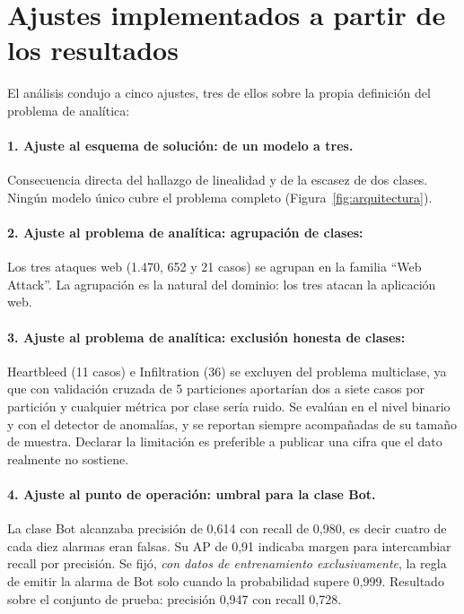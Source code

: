 \documentclass[11pt,a4paper]{article}
\begin{document}
\section{Ajustes implementados a partir de los resultados}
\label{sec:ajustes}

El análisis condujo a cinco ajustes, tres de ellos sobre la propia definición
del problema de analítica:

\paragraph{1. Ajuste al esquema de solución: de un modelo a tres.}
Consecuencia directa del hallazgo de linealidad y de la escasez de dos
clases. Ningún modelo único cubre el problema completo
(Figura~\ref{fig:arquitectura}).

\paragraph{2. Ajuste al problema de analítica: agrupación de clases:}
Los tres ataques web (1.470, 652 y 21 casos) se agrupan en la familia
``Web Attack''. La agrupación es la natural del dominio: los tres
atacan la aplicación web.

\paragraph{3. Ajuste al problema de analítica: exclusión honesta de clases:}
Heartbleed (11 casos) e Infiltration (36) se excluyen del problema
multiclase, ya que con validación cruzada de 5 particiones aportarían dos a siete
casos por partición y cualquier métrica por clase sería ruido. Se evalúan en
el nivel binario y con el detector de anomalías, y se reportan siempre
acompañadas de su tamaño de muestra. Declarar la limitación es preferible a
publicar una cifra que el dato realmente no sostiene.

\paragraph{4. Ajuste al punto de operación: umbral para la clase Bot.}
La clase Bot alcanzaba precisión de 0,614 con recall de 0,980, es decir cuatro de cada
diez alarmas eran falsas. Su AP de 0,91 indicaba margen para intercambiar
recall por precisión. Se fijó, \emph{con datos de entrenamiento
exclusivamente}, la regla de emitir la alarma de Bot solo cuando la probabilidad
supere 0,999. Resultado sobre el conjunto de prueba: precisión 0,947 con
recall 0,728.
\end{document}

